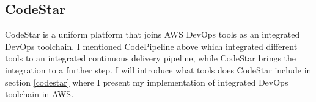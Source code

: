 \subsection{CodeStar}
CodeStar is a uniform platform that joins AWS DevOps tools as an integrated DevOps toolchain. I mentioned CodePipeline above which integrated different tools to an integrated continuous delivery pipeline, while CodeStar brings the integration to a further step.
I will introduce what tools does CodeStar include in section \ref{codestar} where I present my implementation of integrated DevOps toolchain in AWS.